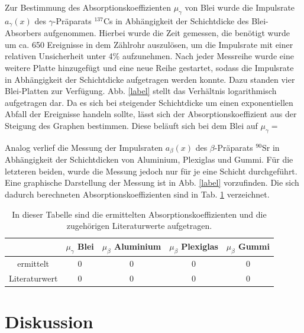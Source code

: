 	Zur Bestimmung des Absorptionskoeffizienten $\mu_\gamma$ von Blei wurde die Impulsrate $a_\gamma (x)$ des $\gamma$-Präparats $^{137}$Cs in Abhängigkeit der Schichtdicke des Blei-Absorbers aufgenommen.	
	Hierbei wurde die Zeit gemessen, die benötigt wurde um ca. 650 Ereignisse in dem Zählrohr auszulösen, um die Impulsrate mit einer relativen Unsicherheit unter 4\% aufzunehmen.
	Nach jeder Messreihe wurde eine weitere Platte hinzugefügt und eine neue Reihe gestartet, sodass die Impulsrate in Abhängigkeit der Schichtdicke aufgetragen werden konnte.
	Dazu standen vier Blei-Platten zur Verfügung.
	Abb. \ref{label} stellt das Verhältnis logarithmisch aufgetragen dar. %
	Da es sich bei steigender Schichtdicke um einen exponentiellen Abfall der Ereignisse handeln sollte, lässt sich der Absorptionskoeffizient aus der Steigung des Graphen bestimmen.
	Diese beläuft sich bei dem Blei auf $\mu_\gamma = $ %
	
	Analog verlief die Messung der Impulsraten $a_\beta (x)$ des $\beta$-Präparats $^{90}$Sr in Abhängigkeit der Schichtdicken von Aluminium, Plexiglas und Gummi.
	Für die letzteren beiden, wurde die Messung jedoch nur für je eine Schicht durchgeführt.
	Eine graphische Darstellung der Messung ist in Abb. \ref{label} vorzufinden. %
	Die sich dadurch berechneten Absorptionskoeffizienten sind in Tab. \ref{tab:Werte} verzeichnet. %
	
	\begin{table}
		\caption{In dieser Tabelle sind die ermittelten Absorptionskoeffizienten und die zugehörigen Literaturwerte\cite{temp} aufgetragen.}
		\label{tab:Werte}
		\centering
		\begin{tabular}{c|c|c|c|c}					
				& $\mu_\gamma$ Blei &  $\mu_\beta$ Aluminium & $\mu_\beta$ Plexiglas &$\mu_\beta$ Gummi \\
			\hline	
			ermittelt & \SI{0}{} & \SI{0}{} & \SI{0}{} & \SI{0}{} \\
			Literaturwert & \SI{0}{} & \SI{0}{} & \SI{0}{} & \SI{0}{} \\		
		\end{tabular}
	\end{table}
	
\section{Diskussion}
	
	